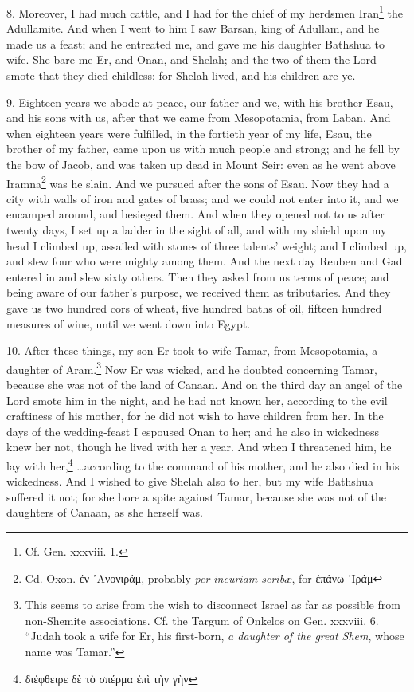 8. Moreover, I had much cattle, and I had for the chief of my herdsmen Iran\footnote{Cf. Gen. xxxviii. 1.} the Adullamite. And when I went to him I saw Barsan, king of Adullam, and he made us a feast; and he entreated me, and gave me his daughter Bathshua to wife. She bare me Er, and Onan, and Shelah; and the two of them the Lord smote that they died childless: for Shelah lived, and his children are ye.

9. Eighteen years we abode at peace, our father and we, with his brother Esau, and his sons with us, after that we came from Mesopotamia, from Laban. And when eighteen years were fulfilled, in the fortieth year of my life, Esau, the brother of my father, came upon us with much people and strong; and he fell by the bow of Jacob, and was taken up dead in Mount Seir: even as he went above Iramna\footnote{Cd. Oxon. \textgreek{ἐν ᾽Ανονιράμ}, probably \emph{per incuriam scribæ}, for \textgreek{ἐπάνω ᾽Ιράμ}} was he slain. And we pursued after the sons of Esau. Now they had a city with walls of iron and gates of brass; and we could not enter into it, and we encamped around, and besieged them. And when they opened not to us after twenty days, I set up a ladder in the sight of all, and with my shield upon my head I climbed up, assailed with stones of three talents’ weight; and I climbed up, and slew four who were mighty among them. And the next day Reuben and Gad entered in and slew sixty others. Then they asked from us terms of peace; and being aware of our father’s purpose, we received them as tributaries. And they gave us two hundred cors of wheat, five hundred baths of oil, fifteen hundred measures of wine, until we went down into Egypt.

10. After these things, my son Er took to wife Tamar, from Mesopotamia, a daughter of Aram.\footnote{This seems to arise from the wish to disconnect Israel as far as possible from non-Shemite associations. Cf. the Targum of Onkelos on Gen. xxxviii. 6. “Judah took a wife for Er, his first-born, \emph{a daughter of the great Shem}, whose name was Tamar.”} Now Er was wicked, and he doubted concerning Tamar, because she was not of the land of Canaan. And on the third day an angel of the Lord smote him in the night, and he had not known her, according to the evil craftiness of his mother, for he did not wish to have children from her. In the days of the wedding-feast I espoused Onan to her; and he also in wickedness knew her not, though he lived with her a year. And when I threatened him, he lay with her,\footnote{\textgreek{διέφθειρε δὲ τὸ σπέρμα ἐπὶ τὴν γὴν}} …according to the command of his mother, and he also died in his wickedness. And I wished to give Shelah also to her, but my wife Bathshua suffered it not; for she bore a spite against Tamar, because she was not of the daughters of Canaan, as she herself was.

